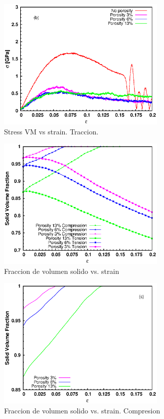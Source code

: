 \documentclass[10pt, oneside]{article} %
\begin{document}
\begin{figure}[H]
\centering
\includegraphics[width=8cm]{Figures/porosity_stress_strain_tens.eps}
\caption{Stress VM vs strain. Traccion.}
\end{figure}


\begin{figure}[H]
\centering
\includegraphics[width=8cm]{Figures/porosity_SVF_strain.eps}
\caption{Fraccion de volumen solido vs. strain}
\end{figure}

\begin{figure}[H]
\centering
\includegraphics[width=8cm]{Figures/porosity_SVF_strain_comp.eps}
\caption{Fraccion de volumen solido vs. strain. Compresion}
\end{figure}
\end{document}
